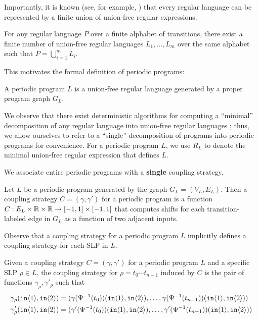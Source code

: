Importantly, it is known (see, for example, \cite{afoninMinimalUnionFreeDecompositions2009}) that every regular language can be represented by a finite union of union-free regular expressions. 

\begin{cor}
    For any regular language $P$ over a finite alphabet of transitions, there exist a finite number of union-free regular languages $L_1,\ldots, L_m$ over the same alphabet such that $P = \bigcup_{i=1}^m L_i$.
\end{cor}

This motivates the formal definition of periodic programs:

\begin{defn}
    A periodic program $L$ is a union-free regular language generated by a proper program graph $G_L$.
\end{defn}

We observe that there exist deterministic algorithms for computing a ``minimal'' decomposition of any regular language into union-free regular languages \cite{afoninMinimalUnionFreeDecompositions2009}; thus, we allow ourselves to refer to a ``single'' decomposition of programs into periodic programs for convenience. 
For a periodic program $L$, we use $R_L$ to denote the minimal union-free regular expression that defines $L$.

We associate entire periodic programs with a \textbf{single} coupling strategy.

\begin{defn}
    Let $L$ be a periodic program generated by the graph $G_L = (V_L, E_L)$. Then a coupling strategy $C = (\gamma, \gamma')$ for a periodic program is a function $C:E_L\times\mathbb{R} \times\mathbb{R}\to [-1, 1]\times[-1, 1]$ that computes shifts for each transition-labeled edge in $G_L$ as a function of two adjacent inputs.
\end{defn}

Observe that a coupling strategy for a periodic program $L$ implicitly defines a coupling strategy for each SLP in $L$. 

\begin{defn}\label{svInducedCouplingStrategy}
    Given a coupling strategy $C = (\gamma, \gamma')$ for a periodic program $L$ and a specific SLP $\rho\in L$, the coupling strategy for $\rho=t_0\cdots t_{n-1}$ induced by $C$ is the pair of functions $\gamma_\rho, \gamma'_\rho$ such that 
    \begin{align*}
        \gamma_\rho(\texttt{in}\langle1 \rangle, \texttt{in}\langle2 \rangle) &= (\gamma(\Psi^{-1}(t_0))(\texttt{in}\langle1 \rangle, \texttt{in}\langle2 \rangle), \ldots,\gamma(\Psi^{-1}(t_{n-1}))(\texttt{in}\langle1 \rangle, \texttt{in}\langle2 \rangle) )\\
        \gamma'_\rho(\texttt{in}\langle1 \rangle, \texttt{in}\langle2 \rangle) &= (\gamma'(\Psi^{-1}(t_0))(\texttt{in}\langle1 \rangle, \texttt{in}\langle2 \rangle),\ldots,\gamma'(\Psi^{-1}(t_{n-1}))(\texttt{in}\langle1 \rangle, \texttt{in}\langle2 \rangle) )
    \end{align*}
\end{defn}

